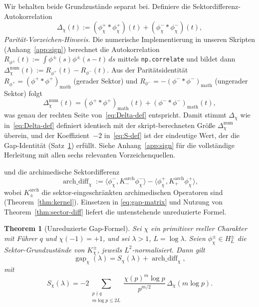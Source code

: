 \documentclass[a4paper,10pt,twocolumn]{article}
\newtheorem{theorem}{Theorem}[section]
\theoremstyle{definition}
\theoremstyle{remark}
\newcommand{\gap}{\operatorname{gap}}
\newcommand{\chifn}{\chi}
\newcommand{\Deltachi}{\Delta_{\chifn}}
\newcommand{\archdiff}{\operatorname{arch\_diff}}
\begin{document}
Wir behalten beide Grundzustände separat bei. Definiere die Sektordifferenz-Autokorrelation
\begin{equation}
\label{eq:Delta-def}
  \Deltachi(t)
    := (\phi^+_{\chifn}\!*\phi^+_{\chifn})(t)
      + (\phi^-_{\chifn}\!*\phi^-_{\chifn})(t),
\end{equation}
\emph{Parität-Vorzeichen-Hinweis.} Die numerische Implementierung in unseren Skripten
(Anhang~\ref{app:sign}) berechnet die Autokorrelation
$R_{\phi^\pm}(t):=\int\phi^\pm(s)\phi^\pm(s-t)\,ds$ mittels
\texttt{np.correlate} und bildet dann
$\Deltachi^{\mathrm{num}}(t):=R_{\phi^+}(t)-R_{\phi^-}(t)$.
Aus der Paritätsidentität $R_{\phi^+}=(\phi^+{*}\phi^+)_{\mathrm{math}}$
(gerader Sektor) und $R_{\phi^-}=-(\phi^-{*}\phi^-)_{\mathrm{math}}$
(ungerader Sektor) folgt
\[
  \Deltachi^{\mathrm{num}}(t)
    =(\phi^+{*}\phi^+)_{\mathrm{math}}(t)+(\phi^-{*}\phi^-)_{\mathrm{math}}(t),
\]
was genau der rechten Seite von~\eqref{eq:Delta-def} entspricht. Damit stimmt
$\Deltachi$ wie in~\eqref{eq:Delta-def} definiert identisch mit der
skript-berechneten Größe $\Deltachi^{\mathrm{num}}$ überein, und der
Koeffizient~$-2$ in~\eqref{eq:S-def} ist der eindeutige Wert, der
die Gap-Identität (Satz~\ref{thm:closure}) erfüllt. Siehe
Anhang~\ref{app:sign} für die vollständige Herleitung mit allen sechs
relevanten Vorzeichenquellen.

und die archimedische Sektordifferenz
\begin{equation}
\label{eq:arch-diff-def}
  \archdiff_{\chifn}
    := \langle\phi^-_{\chifn},K^{\mathrm{arch}}_-\phi^-_{\chifn}\rangle
     - \langle\phi^+_{\chifn},K^{\mathrm{arch}}_+\phi^+_{\chifn}\rangle,
\end{equation}
wobei $K^{\mathrm{arch}}_\pm$ die sektor-eingeschränkten archimedischen
Operatoren sind (Theorem~\ref{thm:kernel}). Einsetzen in
\eqref{eq:gap-matrix} und Nutzung von Theorem~\ref{thm:sector-diff} liefert
die untenstehende unreduzierte Formel.

\begin{theorem}[Unreduzierte Gap-Formel]
\label{thm:closure}
Sei $\chifn$ ein primitiver reeller Charakter mit Führer $q$ und
$\chifn(-1)=+1$, und sei $\lambda>1$, $L=\log\lambda$. Seien
$\phi^\pm_{\chifn}\in H_L^\pm$ die Sektor-Grundzustände von
$K_{\chifn}^\pm$, jeweils $L^2$-normalisiert. Dann gilt
\begin{equation}
\label{eq:gap-unreduced}
  \gap_{\chifn}(\lambda)
    = S_{\chifn}(\lambda) + \archdiff_{\chifn},
\end{equation}
mit
\begin{equation}
\label{eq:S-def}
  S_{\chifn}(\lambda)
    = -2\sum_{\substack{p\nmid q\\m\log p\leq 2L}}
      \frac{\chifn(p)^m\log p}{p^{m/2}}\,\Deltachi(m\log p).
\end{equation}
\end{theorem}
\end{document}
